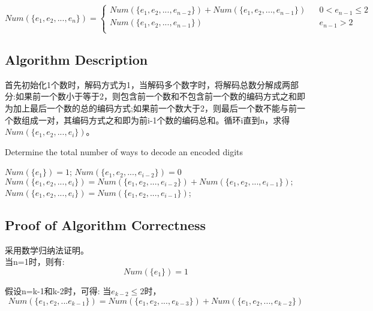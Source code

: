 \documentclass{article}
\begin{document}
\begin{CJK*}{UTF8}{gbsn}
\begin{equation} 
Num(\{e_1,e_2,...,e_n\})=\left\{
\begin{array}{lcr}
Num(\{e_1,e_2,...,e_{n-2}\}) + Num(\{e_1,e_2,...,e_{n-1}\})      &      & 0< e_{n-1} \leq 2\\
Num(\{e_1,e_2,...,e_{n-1}\})     &      & e_{n-1} > 2\\

\end{array} \right.
\end{equation} 

\subsection{Algorithm Description}
首先初始化1个数时，解码方式为1，当解码多个数字时，将解码总数分解成两部分:如果前一个数小于等于2，则包含前一个数和不包含前一个数的编码方式之和即为加上最后一个数的总的编码方式;如果前一个数大于2，则最后一个数不能与前一个数组成一对，其编码方式之和即为前i-1个数的编码总和。循环i直到n，求得$Num(\{e_1,e_2,...,e_i\})$。

\begin{algorithm}[htbp]  
  \caption{Determine the total number of ways to decode an encoded digits}  
  \begin{algorithmic}[1] 
	\State $Num(\{e_1\})=1$;
	\State $Num(\{e_1,e_2,...,e_{i-2}\})=0$
	\EndIf
	\State $Num(\{e_1,e_2,...,e_i\})=Num(\{e_1,e_2,...,e_{i-2}\}) + Num(\{e_1,e_2,...,e_{i-1}\});$
	\Else 
	\State $Num(\{e_1,e_2,...,e_i\}) = Num(\{e_1,e_2,...,e_{i-1}\})$;
	\EndIf
     \EndFor
    \EndFunction  
  \end{algorithmic}  
\end{algorithm} 


\subsection{Proof of Algorithm Correctness}
采用数学归纳法证明。
\\

当n=1时，则有:
\begin{equation} 
Num(\{e_1\})=1
\end{equation} 

假设n=k-1和k-2时，可得:
当$e_{k-2} \leq 2$时，
\begin{equation}
Num(\{e_1,e_2,...e_{k-1}\})=Num(\{e_1,e_2,...,e_{k-3}\}) + Num(\{e_1,e_2,...,e_{k-2}\})
\end{equation}


\end{CJK*}
\end{document}
